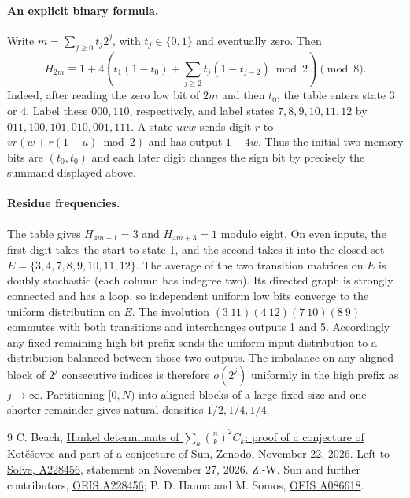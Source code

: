 \documentclass[11pt]{article}
\begin{document}
\paragraph{An explicit binary formula.}
Write $m=\sum_{j\ge0}t_j2^j$, with $t_j\in\{0,1\}$ and eventually zero. Then
\[
 H_{2m}\equiv1+4\left(t_1(1-t_0)+\sum_{j\ge2}t_j(1-t_{j-2})\bmod 2\right)\pmod8 .
\]
Indeed, after reading the zero low bit of $2m$ and then $t_0$, the table enters state $3$ or $4$. Label these $000,110$, respectively, and label states $7,8,9,10,11,12$ by $011,100,101,010,001,111$. A state $uvw$ sends digit $r$ to $vr(w+r(1-u)\bmod2)$ and has output $1+4w$. Thus the initial two memory bits are $(t_0,t_0)$ and each later digit changes the sign bit by precisely the summand displayed above.
\paragraph{Residue frequencies.}
The table gives $H_{4m+1}=3$ and $H_{4m+3}=1$ modulo eight. On even inputs, the first digit takes the start to state 1, and the second takes it into the closed set $E=\{3,4,7,8,9,10,11,12\}$. The average of the two transition matrices on $E$ is doubly stochastic (each column has indegree two). Its directed graph is strongly connected and has a loop, so independent uniform low bits converge to the uniform distribution on $E$. The involution $(3\ 11)(4\ 12)(7\ 10)(8\ 9)$ commutes with both transitions and interchanges outputs 1 and 5. Accordingly any fixed remaining high-bit prefix sends the uniform input distribution to a distribution balanced between those two outputs. The imbalance on any aligned block of $2^j$ consecutive indices is therefore $o(2^j)$ uniformly in the high prefix as $j\to\infty$. Partitioning $[0,N)$ into aligned blocks of a large fixed size and one shorter remainder gives natural densities $1/2,1/4,1/4$.
\begin{thebibliography}{9}
 C. Beach, \href{https://doi.org/10.5281/zenodo.24438853}{Hankel determinants of $\sum_k\binom nk^2 C_k$: proof of a conjecture of Kot\v e\v sovec and part of a conjecture of Sun}, Zenodo, November 22, 2026.
 \href{https://lefttosolve.com/p/oeis-a228456}{Left to Solve, A228456}, statement on November 27, 2026.
 Z.-W. Sun and further contributors, \href{https://oeis.org/A228456}{OEIS A228456}; P. D. Hanna and M. Somos, \href{https://oeis.org/A086618}{OEIS A086618}.
\end{thebibliography}
\end{document}
